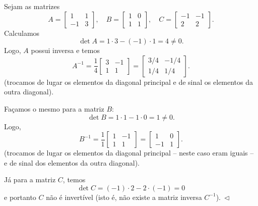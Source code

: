 \begin{ex}\label{exp:2x2}
	Sejam as matrizes
	\begin{equation}
	A = \left[
	\begin{array}{cc}
	1 & 1  \\
	-1 & 3 
	\end{array}
	\right], \quad
	B = \left[
	\begin{array}{cc}
	1 & 0  \\
	1 & 1 
	\end{array}
	\right], \quad
	C = \left[
	\begin{array}{cc}
	-1 & -1  \\
	2 & 2 
	\end{array}
	\right].
	\end{equation} Calculamos
	\begin{equation}
	\det A = 1\cdot 3 - (-1)\cdot 1 = 4 \neq 0.
	\end{equation}
	Logo, $A$ possui inversa e temos
	\begin{equation}
	A^{-1} = \frac{1}{4}
	\left[
	\begin{array}{cc}
	3 & -1  \\
	1 & 1 
	\end{array}
	\right] =
	\left[
	\begin{array}{cc}
	3/4 & -1/4  \\
	1/4 & 1/4 
	\end{array}
	\right].
	\end{equation}(trocamos de lugar os elementos da diagonal principal e de sinal os elementos da outra diagonal).

	Façamos o mesmo para a matriz $B$:
	\begin{equation}
	\det B = 1\cdot 1 - 1 \cdot 0 = 1 \neq 0.
	\end{equation} Logo,
	\begin{equation}
	B^{-1} = \frac{1}{1}
	\left[
	\begin{array}{cc}
	1 & -1  \\
	1 & 1 
	\end{array}
	\right] =
	\left[
	\begin{array}{cc}
	 1 & 0  \\
	-1 & 1 
	\end{array}
	\right].
	\end{equation}(trocamos de lugar os elementos da diagonal principal -- neste caso eram iguais -- e de sinal dos elementos da outra diagonal).

	Já para a matriz $C$, temos
	\begin{equation}
	\det C = (-1) \cdot 2 - 2 \cdot (-1) = 0
	\end{equation} e portanto $C$ não é invertível (isto é, não existe a matriz inversa $C^{-1}$)$. \ \lhd$
\end{ex}




